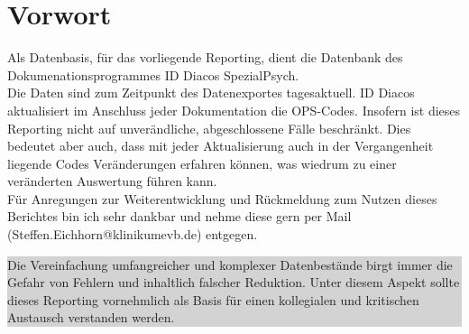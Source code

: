 \clearpage
\section{Vorwort}
Als Datenbasis, für das vorliegende Reporting, dient die Datenbank des Dokumenationsprogrammes ID Diacos SpezialPsych.\\

Die Daten sind zum Zeitpunkt des Datenexportes tagesaktuell. ID Diacos aktualisiert im Anschluss jeder Dokumentation die OPS-Codes. Insofern ist dieses Reporting nicht auf unverändliche, abgeschlossene Fälle beschränkt. Dies bedeutet aber auch, dass mit jeder Aktualisierung auch in der Vergangenheit liegende Codes Veränderungen erfahren können, was wiedrum zu einer veränderten Auswertung führen kann.\\

Für Anregungen zur Weiterentwicklung und Rückmeldung zum Nutzen dieses Berichtes bin ich sehr dankbar und nehme diese gern per Mail (Steffen.Eichhorn@klinikumevb.de) entgegen.
\vfill
\noindent
\colorbox{lightgray}{
\begin{minipage}{\textwidth}
Die Vereinfachung umfangreicher und komplexer Datenbestände birgt immer die Gefahr von Fehlern und inhaltlich falscher Reduktion. Unter diesem Aspekt sollte dieses Reporting vornehmlich als Basis für einen kollegialen und kritischen Austausch verstanden werden.
\end{minipage}
}
\clearpage
